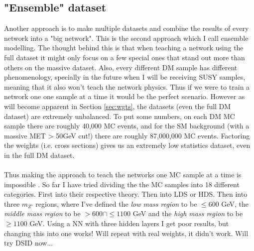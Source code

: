 \documentclass[14pt, a4paper]{book}
\begin{document}
\subsection{"Ensemble" dataset}
Another approach is to make multiple datasets and combine the results of every network into a "big network". This is the second approach which I call ensemble modelling. The thought behind this is that when teaching a network using the full dataset it might only focus on a few special ones that stand out more than others on the massive dataset. Also, every different DM sample has different phenomenology, specially in the future when I will be receiving SUSY samples, meaning that it also won't teach the network physics. Thus if we were to train a network one one sample at a time it would be the perfect scenario. However as will become apparent in Section \ref{sec:wgts}, the datasets (even the full DM dataset) are extremely unbalanced. To put some numbers, on each DM MC sample there are roughly 40,000 MC events, and for the SM background (with a massive MET > 50GeV cut!) there are roughly 87,000,000 MC events. Factoring the weights (i.e. cross sections) gives us an extremely low statistics dataset, even in the full DM dataset. \\
\\Thus making the approach to teach the networks one MC sample at a time is impossible . So far I have tried dividing the the MC samples into 18 different categories. First into their respective theory. Then into LDS or HDS. Then into three $m_{Z'}$ regions, where I've defined the \textit{low mass region} to be $\le 600$ GeV, the \textit{middle mass region} to be $>600 \cap\le 1100$ GeV and the\textit{ high mass region }to be $\ge 1100$ GeV. Using a NN with three hidden layers I get poor results, but changing this into one works! Will repeat with real weights, it didn't work. Will try DSID now...
\end{document}
